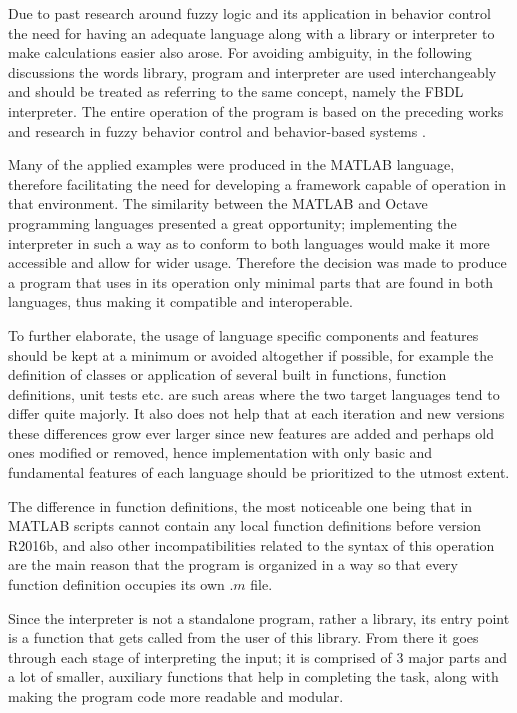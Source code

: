 
Due to past research around fuzzy logic and its application in behavior control the need for having an adequate language along with a library or interpreter to make calculations easier also arose. For avoiding ambiguity, in the following discussions the words library, program and interpreter are used interchangeably and should be treated as referring to the same concept, namely the FBDL interpreter. The entire operation of the program is based on the preceding works and research in fuzzy behavior control and behavior-based systems \cite{pillerkovacs2019}.

Many of the applied examples were produced in the MATLAB language, therefore facilitating the need for  developing a framework capable of operation in that environment. The similarity between the MATLAB and Octave programming languages presented a great opportunity; implementing the interpreter in such a way as to conform to both languages would make it more accessible and allow for wider usage. Therefore the decision was made to produce a program that uses in its operation only minimal parts that are found in both languages, thus making it compatible and interoperable.

To further elaborate, the usage of language specific components and features should be kept at a minimum or avoided altogether if possible, for example the definition of classes or application of several built in functions, function definitions, unit tests etc. are such areas where the two target languages tend to differ quite majorly. It also does not help that at each iteration and new versions these differences grow ever larger since new features are added and perhaps old ones modified or removed, hence implementation with only basic and fundamental features of each language should be prioritized to the utmost extent.


The difference in function definitions, the most noticeable one being that in MATLAB scripts cannot contain any local function definitions before version R2016b, and also other incompatibilities related to the syntax of this operation are the main reason that the program is organized in a way so that every function definition occupies its own $.m$ file. 

Since the interpreter is not a standalone program, rather a library, its entry point is a function that gets called from the user of this library. From there it goes through each stage of interpreting the input; it is comprised of 3 major parts and a lot of smaller, auxiliary functions that help in completing the task, along with making the program code more readable and modular.

